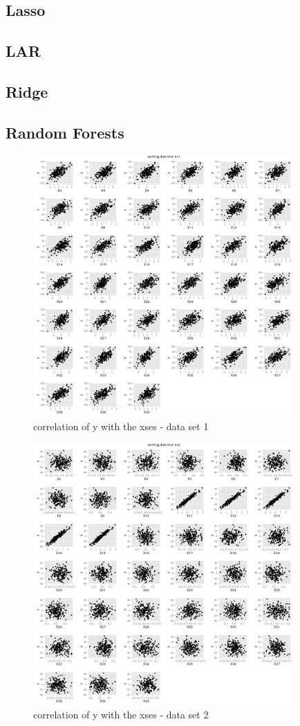 \documentclass[11pt]{article}
\begin{document}
\subsection{Lasso}
\subsection{LAR}
\subsection{Ridge}
\subsection{Random Forests}

\begin{figure}
\caption{correlation of y with the xses - data set 1}
\label{correlograms1}
\centering
\includegraphics[width=100mm]{graphs/correlograms1.png}
\end{figure}

\begin{figure}
\caption{correlation of y with the xses - data set 2}
\label{correlograms2}
\centering
\includegraphics[width=100mm]{graphs/correlograms2.png}
\end{figure}
\end{document}
